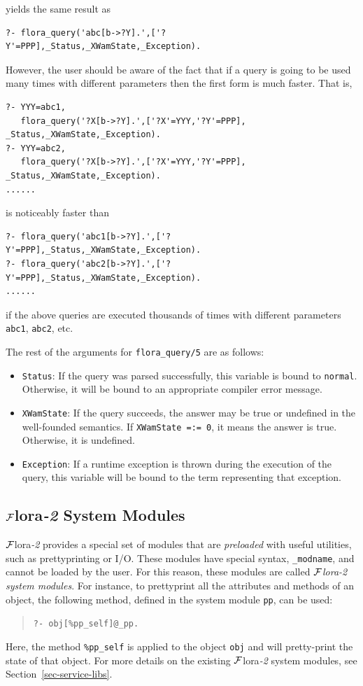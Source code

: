 \documentclass[11pt]{article}
\newcommand{\FLORA}{{\mbox{\sc ${\cal F}${lora}\rm\emph{-2}}}\xspace}
\begin{document}
yields the same result as
\begin{verbatim}
?- flora_query('abc[b->?Y].',['?Y'=PPP],_Status,_XWamState,_Exception).
\end{verbatim}
However, the user should be aware of the fact that if a query is going to
be used many times with different parameters then the first form is much
faster. That is,
\begin{verbatim}
?- YYY=abc1,
   flora_query('?X[b->?Y].',['?X'=YYY,'?Y'=PPP], _Status,_XWamState,_Exception).
?- YYY=abc2,
   flora_query('?X[b->?Y].',['?X'=YYY,'?Y'=PPP], _Status,_XWamState,_Exception).
......
\end{verbatim}
is noticeably faster than
\begin{verbatim}
?- flora_query('abc1[b->?Y].',['?Y'=PPP],_Status,_XWamState,_Exception).
?- flora_query('abc2[b->?Y].',['?Y'=PPP],_Status,_XWamState,_Exception).
......
\end{verbatim}
if the above queries are executed thousands of times with different
parameters {\tt abc1}, {\tt abc2}, etc.

The rest of the arguments for \texttt{flora\_query/5}  are as follows:
\begin{itemize}
\item  \texttt{Status}: If the query was parsed successfully, this variable
  is bound to \texttt{normal}. Otherwise, it will be bound to an appropriate
  compiler error message.
\item  \texttt{XWamState}: If the query succeeds, the answer may be true or
  undefined in the well-founded semantics. If \texttt{XWamState =:= 0}, it
  means the answer is true. Otherwise, it is undefined.
\item \texttt{Exception}: If a runtime exception is thrown during the
  execution of the query, this variable will be bound to the term
  representing that exception. 
\end{itemize}

\subsection{\FLORA System Modules}\label{sec-flora-system-modules}

\FLORA provides a special set of modules that are \emph{preloaded} with
useful utilities, such as prettyprinting or I/O. These modules have special
syntax, {\tt \_modname}, and cannot be loaded by the user. For this
reason, these modules are called \emph{\FLORA system modules}.  For
instance, to prettyprint all the attributes and methods of an object, the
following method, defined in the system module {\tt pp}, can be used:
\begin{quote}
 \tt      ?- obj[\%pp\_self]@\_pp.
\end{quote}
Here, the method {\tt \%pp\_self} is applied to the object {\tt obj} and
will pretty-print the state of that object.
For more details on the existing \FLORA system modules, see
Section~\ref{sec-service-libs}.
\end{document}
